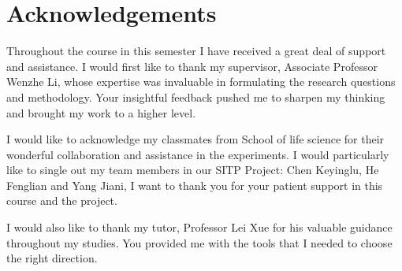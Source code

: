 \newpage
\section*{Acknowledgements}
Throughout the course in this semester I have received a great deal of support and assistance.
I would first like to thank my supervisor, Associate Professor Wenzhe Li, whose expertise was invaluable in formulating the research questions and methodology. Your insightful feedback pushed me to sharpen my thinking and brought my work to a higher level.

I would like to acknowledge my classmates from School of life science for their wonderful collaboration and assistance in the experiments. I would particularly like to single out my team members in our SITP Project: Chen Keyinglu, He Fenglian and Yang Jiani, I want to thank you for your patient support in this course and the project.

I would also like to thank my tutor, Professor Lei Xue for his valuable guidance throughout my studies. You provided me with the tools that I needed to choose the right direction.

